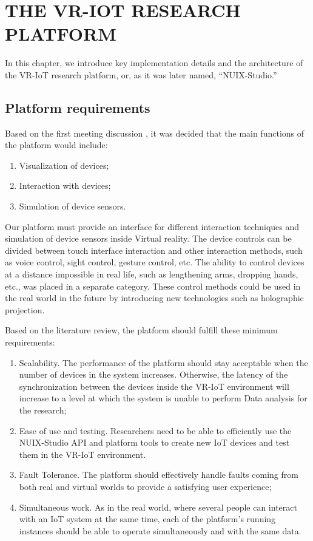 
\chapter{\MakeUppercase{The VR-IoT Research Platform}}

In this chapter, we introduce key implementation details and the architecture of the VR-IoT research platform, or, as it was later named, ``NUIX-Studio.''

\section{Platform requirements}

Based on the first meeting discussion \cite{tsinghua_hci_lab_nuix-studio_2021}, it was decided that the main functions of the platform would include:
\begin{enumerate}
     \item Visualization of devices;
     \item Interaction with devices;
     \item Simulation of device sensors.
\end{enumerate}

Our platform must provide an interface for different interaction techniques and simulation of device sensors inside Virtual reality. The device controls can be divided between touch interface interaction and other interaction methods, such as voice control, sight control, gesture control, etc. The ability to control devices at a distance impossible in real life, such as lengthening arms, dropping hands, etc., was placed in a separate category. These control methods could be used in the real world in the future by introducing new technologies such as holographic projection.

Based on the literature review, the platform should fulfill these minimum requirements:
\begin{enumerate}
\item Scalability. The performance of the platform should stay acceptable when the number of devices in the system increases. Otherwise, the latency of the synchronization between the devices inside the VR-IoT environment will increase to a level at which the system is unable to perform Data analysis for the research;
\item Ease of use and testing. Researchers need to be able to efficiently use the NUIX-Studio API and platform tools to create new IoT devices and test them in the VR-IoT environment.
\item Fault Tolerance. The platform should effectively handle faults coming from both real and virtual worlds to provide a satisfying user experience;
\item Simultaneous work. As in the real world, where several people can interact with an IoT system at the same time, each of the platform's running instances should be able to operate simultaneously and with the same data.
\end{enumerate}

